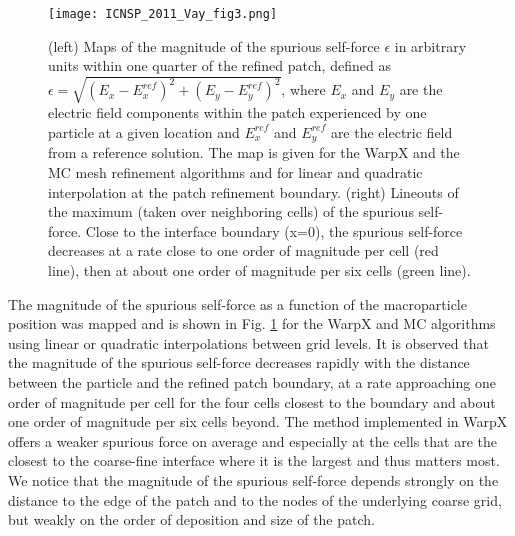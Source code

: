 \begin{figure}[htb]
  \centering
  \texttt{[image: ICNSP\_2011\_Vay\_fig3.png]}
  \caption{(left) Maps of the magnitude of the spurious self-force $\epsilon$ in arbitrary units within one quarter of the refined patch, defined as $\epsilon=\sqrt{(E_x-E_x^{ref})^2+(E_y-E_y^{ref})^2}$, where $E_x$ and $E_y$ are the electric field components within the patch experienced by one particle at a given location and $E_x^{ref}$ and $E_y^{ref}$ are the electric field from a reference solution. The map is given for the WarpX and the MC mesh refinement algorithms and for linear and quadratic interpolation at the patch refinement boundary. (right) Lineouts of the maximum (taken over neighboring cells) of the spurious self-force. Close to the interface boundary (x=0), the spurious self-force decreases at a rate close to one order of magnitude per cell (red line), then at about one order of magnitude per six cells (green line).}
  \label{fig:ESselfforcemap}
\end{figure}
The magnitude of the spurious self-force as a function of the macroparticle position was mapped and is shown in Fig. \ref{fig:ESselfforcemap} for the WarpX and MC algorithms using linear or quadratic interpolations between grid levels. It is observed that the magnitude of the spurious self-force decreases rapidly with the distance between the particle and the refined patch boundary, at a rate approaching one order of magnitude per cell for the four cells closest to the boundary and about one order of magnitude per six cells beyond. The method implemented in WarpX offers a weaker spurious force on average and especially at the cells that are the closest to the coarse-fine interface where it is the largest and thus matters most.
We notice that the magnitude of the spurious self-force depends strongly on the distance to the edge of the patch and to the nodes of the underlying coarse grid, but weakly on the order of deposition and size of the patch.

